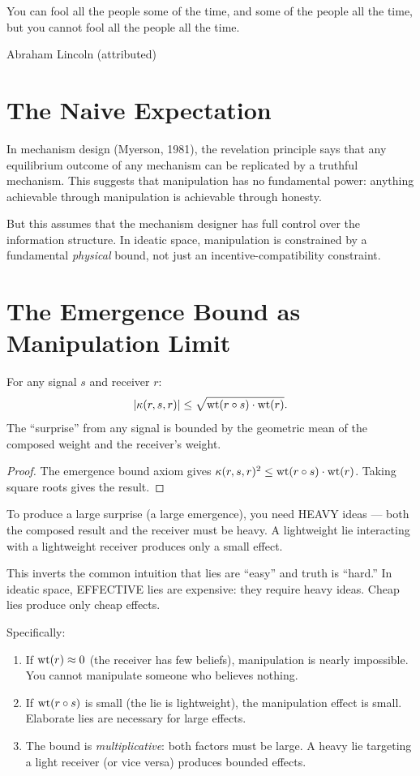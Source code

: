 \epigraph{You can fool all the people some of the time, and some of the people all the time, but you cannot fool all the people all the time.}{Abraham Lincoln (attributed)}

\section{The Naive Expectation}

In mechanism design (Myerson, 1981), the revelation principle says that any equilibrium outcome of any mechanism can be replicated by a truthful mechanism. This suggests that manipulation has no fundamental power: anything achievable through manipulation is achievable through honesty.

But this assumes that the mechanism designer has full control over the information structure. In ideatic space, manipulation is constrained by a fundamental \emph{physical} bound, not just an incentive-compatibility constraint.

\section{The Emergence Bound as Manipulation Limit}

\begin{theorem}
\label{thm:manipulation-bound-2}
For any signal $s$ and receiver $r$:
\[
|\kappa(r, s, r)| \leq \sqrt{\operatorname{wt}(r \circ s) \cdot \operatorname{wt}(r)}.
\]
The ``surprise'' from any signal is bounded by the geometric mean of the composed weight and the receiver's weight.
\end{theorem}

\begin{proof}
The emergence bound axiom gives $\kappa(r,s,r)^2 \leq \operatorname{wt}(r \circ s) \cdot \operatorname{wt}(r)$. Taking square roots gives the result.
\end{proof}

\begin{paradox}
To produce a large surprise (a large emergence), you need HEAVY ideas --- both the composed result and the receiver must be heavy. A lightweight lie interacting with a lightweight receiver produces only a small effect.

This inverts the common intuition that lies are ``easy'' and truth is ``hard.'' In ideatic space, EFFECTIVE lies are expensive: they require heavy ideas. Cheap lies produce only cheap effects.

Specifically:
\begin{enumerate}
\item If $\operatorname{wt}(r) \approx 0$ (the receiver has few beliefs), manipulation is nearly impossible. You cannot manipulate someone who believes nothing.
\item If $\operatorname{wt}(r \circ s)$ is small (the lie is lightweight), the manipulation effect is small. Elaborate lies are necessary for large effects.
\item The bound is \emph{multiplicative}: both factors must be large. A heavy lie targeting a light receiver (or vice versa) produces bounded effects.
\end{enumerate}
\end{paradox}

